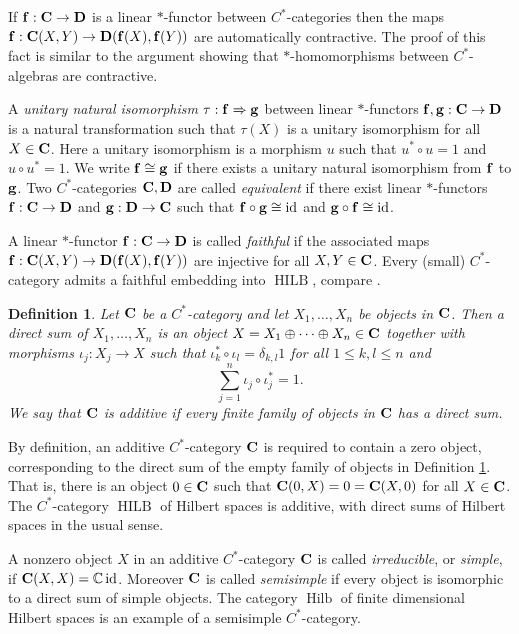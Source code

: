 \documentclass[a4paper]{amsart}
\newcommand*{\Bf}{{\bf f}}
\newcommand*{\Bg}{{\bf g}}
\newcommand*{\BC}{{\bf C}}
\newcommand*{\BD}{{\bf D}}
\DeclareMathOperator{\id}{id}
\DeclareMathOperator{\Hilb}{Hilb}
\DeclareMathOperator{\HILB}{HILB}
\numberwithin{equation}{section}
\theoremstyle{change}
\newtheorem{definition}[theorem]{Definition}
\begin{document}
If $ \Bf: \BC \rightarrow \BD $ is a linear $ * $-functor between $ C^* $-categories then the maps $ \Bf: \BC(X, Y) \rightarrow \BD(\Bf(X), \Bf(Y)) $ are automatically contractive. The proof of this fact is similar to the argument showing that $ * $-homomorphisms between $ C^* $-algebras are contractive.

A \emph{unitary natural isomorphism} $ \tau: \Bf \Rightarrow \Bg $ between linear $ * $-functors $  \Bf, \Bg: \BC \rightarrow \BD $ is a natural transformation such that $ \tau(X) $ is a unitary isomorphism for all $ X \in \BC $. 
Here a unitary isomorphism is a morphism $ u $ such that $ u^* \circ u = 1 $ and $ u \circ u^* = 1 $. 
We write $ \Bf \cong \Bg $ if there exists a unitary natural isomorphism from $ \Bf $ to $ \Bg $. Two $ C^* $-categories $ \BC, \BD $ are called \emph{equivalent} if there exist linear $ * $-functors $ \Bf: \BC \rightarrow \BD $ 
and $ \Bg: \BD \rightarrow \BC $ such that $ \Bf \circ \Bg \cong \id $ and $ \Bg \circ \Bf \cong \id $. 

A linear $ * $-functor $ \Bf: \BC \rightarrow \BD $ is called \emph{faithful} if the associated maps $ \Bf: \BC(X,Y) \rightarrow \BD(\Bf(X), \Bf(Y)) $ are 
injective for all $ X, Y \in \BC $. Every (small) $ C^* $-category admits a faithful embedding into $ \HILB $, compare \cite[Theorem 6.12]{MITCHENER_cstarcategories}.  

\begin{definition} \label{defdirectsum}
Let $ \BC $ be a $ C^* $-category and let $ X_1, \dots, X_n $ be objects in $ \BC $. Then a \emph{direct sum} of $ X_1, \dots, X_n $ 
is an object $ X = X_1 \oplus \cdots \oplus X_n \in \BC $ together with morphisms $ \iota_j: X_j \rightarrow X $ 
such that $ \iota_k^* \circ \iota_l = \delta_{k,l} 1 $ for all $ 1 \leq k,l \leq n $ and 
$$
\sum_{j = 1}^n \iota_j \circ \iota_j^* = 1.  
$$ 
We say that $ \BC $ is additive if every finite family of objects in $ \BC $ has a direct sum. 
\end{definition} 

By definition, an additive $ C^* $-category $ \BC $ is required to contain a zero object, corresponding to the direct sum of the empty family of objects in Definition \ref{defdirectsum}. That is, there is an object $ 0 \in \BC $ such that $ \BC(0, X) = 0 = \BC(X,0) $ for all $ X \in \BC $. 
The $ C^* $-category $ \HILB $ of Hilbert spaces is additive, with direct sums of Hilbert spaces in the usual sense. 

A nonzero object $ X $ in an additive $ C^* $-category $\BC $ is called \emph{irreducible}, or \emph{simple}, if $ \BC(X,X) = \mathbb{C} \id $. Moreover $ \BC $ is called \emph{semisimple} if 
every object is isomorphic to a direct sum of simple objects. The category $ \Hilb $  of finite dimensional Hilbert spaces is an example of a semisimple $ C^* $-category. 
\end{document}
